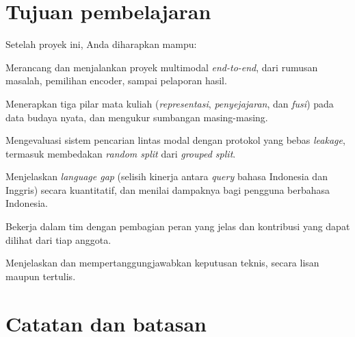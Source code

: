 \documentclass[12pt, a4paper]{article}
\begin{document}
\section{Tujuan pembelajaran}\label{sec:objectives}

Setelah proyek ini, Anda diharapkan mampu:

\begin{objectives}
  \item Merancang dan menjalankan proyek multimodal \emph{end-to-end}, dari rumusan masalah, pemilihan encoder, sampai pelaporan hasil.
  \item Menerapkan tiga pilar mata kuliah (\emph{representasi}, \emph{penyejajaran}, dan \emph{fusi}) pada data budaya nyata, dan mengukur sumbangan masing-masing.
  \item Mengevaluasi sistem pencarian lintas modal dengan protokol yang bebas \emph{leakage}, termasuk membedakan \emph{random split} dari \emph{grouped split}.
  \item Menjelaskan \emph{language gap} (selisih kinerja antara \emph{query} bahasa Indonesia dan Inggris) secara kuantitatif, dan menilai dampaknya bagi pengguna berbahasa Indonesia.
  \item Bekerja dalam tim dengan pembagian peran yang jelas dan kontribusi yang dapat dilihat dari tiap anggota.
  \item Menjelaskan dan mempertanggungjawabkan keputusan teknis, secara lisan maupun tertulis.
\end{objectives}

\section{Catatan dan batasan}\label{sec:notes}
\end{document}
